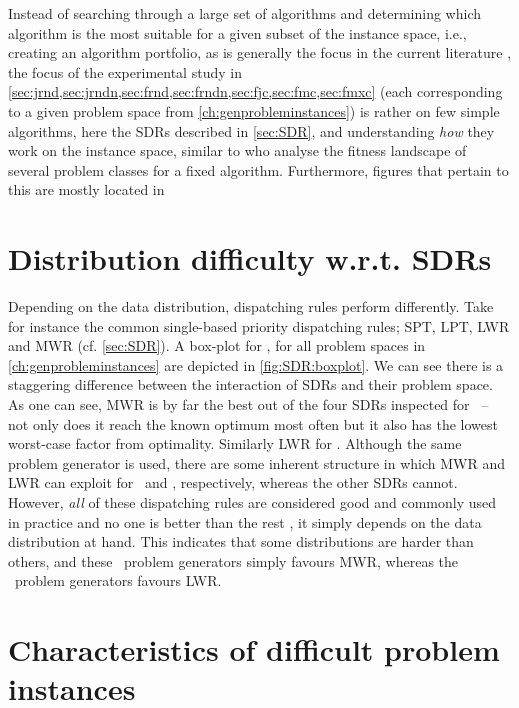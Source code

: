 Instead of searching through a large set of algorithms  and determining which algorithm is the most suitable for a given subset of the instance space, i.e., creating an algorithm portfolio, as is generally the focus in the current literature \citep{SmithMilesLion3,SmithMilesLion5,Corne10}, the focus of the experimental study in \cref{sec:jrnd,sec:jrndn,sec:frnd,sec:frndn,sec:fjc,sec:fmc,sec:fmxc} 
(each corresponding to a given problem space from \cref{ch:genprobleminstances})
is rather on few simple algorithms, here the SDRs described in \cref{sec:SDR}, and understanding \emph{how} they work on the instance space, similar to \citet{Whitley} who analyse the fitness landscape of several problem classes for a fixed algorithm. Furthermore, figures that pertain to this  are mostly located in 



\section{Distribution difficulty w.r.t. SDRs}
Depending on the data distribution, dispatching rules perform differently. Take for instance the common single-based priority dispatching rules; SPT, LPT, LWR and MWR (cf. \cref{sec:SDR}). 
A box-plot for \fullnamerho, for all problem spaces in \cref{ch:genprobleminstances} are depicted in \cref{fig:SDR:boxplot}. 
We can see there is a staggering difference between the interaction of SDRs and their problem space. 
As one can see, MWR is by far the best out of the four SDRs inspected for \JSP\ -- not only does it reach the known optimum most often but it also has the lowest worst-case factor from optimality. Similarly LWR for \FSP.
Although the same problem generator is used, there are some inherent structure in which MWR and LWR can exploit for \JSP\ and  \FSP, respectively, whereas the other SDRs cannot. However, \emph{all} of these dispatching rules are considered good and commonly used in practice and no one is better than the rest \citep{Haupt89}, it simply depends on the data distribution at hand. This indicates that some distributions are harder than others, and these \JSP\ problem generators simply favours MWR, whereas the \FSP\ problem generators favours LWR. 

\section{Characteristics of difficult problem instances}


